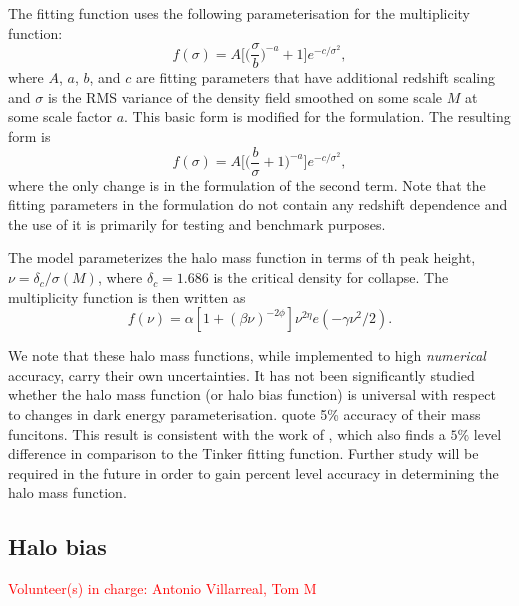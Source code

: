 \documentclass[\docopts]{\docclass}
\newcommand{\vol}[1]{\textcolor{red}{Volunteer(s) in charge: #1}}
\begin{document}
The \citet{Tinker2008} fitting function uses the following parameterisation for the multiplicity function:
\begin{equation}
f(\sigma)=A\Big[\Big(\frac{\sigma}{b}\Big)^{-a}+1\Big]e^{-c/{\sigma}^2},
\end{equation}
where $A$, $a$, $b$, and $c$ are fitting parameters that have additional redshift scaling and $\sigma$ is the RMS variance of the density field smoothed on some scale $M$ at some scale factor $a$. This basic form is modified for the \citet{Angulo2012} formulation. The resulting form is
\begin{equation}
f(\sigma)=A\Big[\Big(\frac{b}{\sigma}+1\Big)^{-a}\Big]e^{-c/{\sigma}^2},
\end{equation}
where the only change is in the formulation of the second term. Note that the fitting parameters in the \citet{Angulo2012} formulation do not contain any redshift dependence and the use of it is primarily for testing and benchmark purposes.

The \citet{Tinker2010} model parameterizes the halo mass function in terms of th peak height, $\nu = \delta_c/\sigma(M)$, where $\delta_c=1.686$ is the critical density for collapse. The multiplicity function is then written as
\begin{equation}
  f(\nu) = \alpha[1+(\beta\nu)^{-2\phi}]\nu^{2\eta}e(-\gamma\nu^2/2).
\end{equation}

We note that these halo mass functions, while implemented to high {\em numerical} accuracy, carry their own uncertainties. It has not been significantly studied whether the halo mass function (or halo bias function) is universal with respect to changes in dark energy parameterisation.
\citet{Tinker2008,Tinker2010} quote 5\% accuracy of their mass funcitons.
This result is consistent with the work of \citet{Watson2013}, which also finds a $5\%$ level difference in comparison to the Tinker fitting function. Further study will be required in the future in order to gain percent level accuracy in determining the halo mass function.


\subsection{Halo bias}
\label{sec:halo_bias}
\vol{Antonio Villarreal, Tom M}
\end{document}
